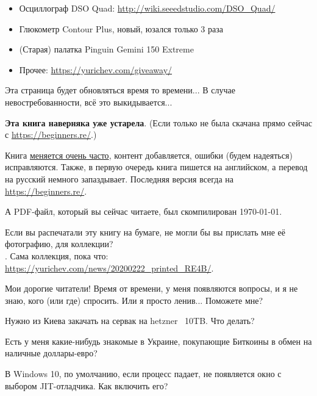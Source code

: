 \begin{itemize}
        \item Осциллограф DSO Quad: \url{http://wiki.seeedstudio.com/DSO_Quad/}
        \item Глюкометр Contour Plus, новый, юзался только 3 раза

        \item (Старая) палатка Pinguin Gemini 150 Extreme
        \item Прочее: \url{https://yurichev.com/giveaway/}

        \end{itemize}

Эта страница будет обновляться время то времени...
В случае невостребованности, всё это выкидывается...
\fi

        \myhrule{}

\textbf{Эта книга наверняка уже устарела}.
(Если только не была скачана прямо сейчас с \url{https://beginners.re/}.)

Книга \href{\RepoURL/ChangeLog}{меняется очень часто},
контент добавляется, ошибки (будем надеяться) исправляются.
Также, в первую очередь книга пишется на английском, а перевод на русский немного запаздывает.
Последняя версия всегда на \url{https://beginners.re/}.

А PDF-файл, который вы сейчас читаете, был скомпилирован \today{}.

\myhrule{}

Если вы распечатали эту книгу на бумаге, не могли бы вы прислать мне её фотографию, для коллекции?\\
\EMAILS{}.
Сама коллекция, пока что: \url{https://yurichev.com/news/20200222_printed_RE4B/}.

\myhrule{}

Мои дорогие читатели! Время от времени, у меня появляются вопросы, и я не знаю, кого (или где) спросить.
Или я просто ленив...
Поможете мне?

\myhrule{}

Нужно из Киева закачать на сервак на hetzner ~10TB. Что делать?

\myhrule{}

Есть у меня какие-нибудь знакомые в Украине, покупающие Биткоины в обмен на наличные доллары-евро?

\myhrule{}

В Windows 10, по умолчанию, если процесс падает, не появляется окно с выбором JIT-отладчика.
Как включить его?

